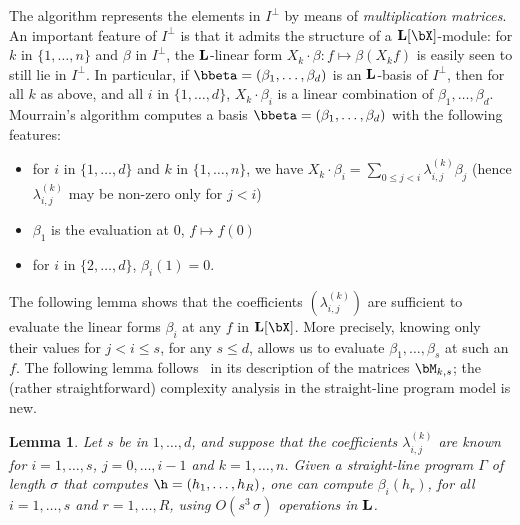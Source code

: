 \documentclass[12pt]{article}
\newtheorem{lemma}[definition]{Lemma}
\begin{document}
The algorithm represents the elements in $I^{\perp}$ by means of {\em
  multiplication matrices}. An important feature of $I^{\perp}$ is
that it admits the structure of a $\LL[\bX]$-module: for $k$ in
$\{1,\dots,n\}$ and $\beta$ in $I^{\perp}$, the $\mathbf{L}$-linear form $X_k
\cdot \beta: f \mapsto \beta(X_k f)$ is easily seen to still lie in
$I^{\perp}$.  In particular, if
$\bbeta=(\beta_1,\dots,\beta_d)$ is an $\mathbf{L}$-basis of
$I^{\perp}$, then for all $k$ as above, and all $i$ in
$\{1,\dots,d\}$, $X_k \cdot \beta_i$ is a linear combination of
$\beta_1,\dots,\beta_d$. Mourrain's algorithm computes a basis
$\bbeta=(\beta_1,\dots,\beta_d)$ with the following features:
\begin{itemize}
\item for $i$ in $\{1,\dots,d\}$ and $k$ in $\{1,\dots,n\}$, we have
  $X_k \cdot \beta_i=\sum_{0 \le j < i} \lambda^{(k)}_{i,j} \beta_j$
  (hence $\lambda^{(k)}_{i,j}$ may be non-zero 
  only for $j<i$)
\item $\beta_1$ is the evaluation at $0$, $f \mapsto f(0)$
\item for $i$ in $\{2,\dots,d\}$, $\beta_i(1)=0$.
\end{itemize}
The following lemma shows that the coefficients $(\lambda^{(k)}_{i,j})$
are sufficient to evaluate  the linear forms $\beta_i$ at any $f$ in
$\LL[\bX]$. More precisely, knowing only their values for $j < i \le s$,
for any $s \le d$, allows us to evaluate $\beta_1,\dots,\beta_s$ at such an $f$.
The following lemma follows~\cite{Mourrain97} in its description
of the matrices $\bM_{k,s}$; the (rather straightforward) complexity analysis 
in the straight-line program model is new.
\begin{lemma}\label{lemma:evalbeta}
   Let $s$ be in $1,\dots,d$, and suppose that the coefficients
  $\lambda^{(k)}_{i,j}$ are known for $i=1,\dots,s$, $j=0,\dots,i-1$
  and $k=1,\dots,n$. Given a straight-line program $\Gamma$ of length
  $\sigma$ that computes $\h=(h_1,\dots,h_R)$, one can compute
  $\beta_i(h_r)$, for all $i=1,\dots,s$ and $r=1,\dots,R$, using
  $O(s^3\,\sigma)$ operations in $\mathbf{L}$.
\end{lemma}
\end{document}
